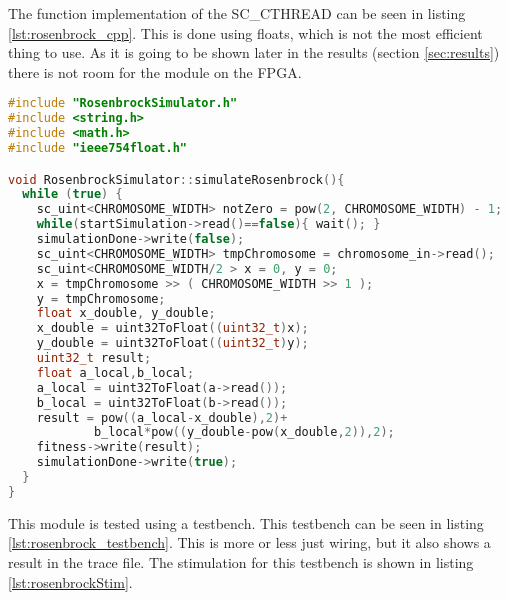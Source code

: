 The function implementation of the SC\_CTHREAD can be seen in listing \ref{lst:rosenbrock_cpp}. This is done using floats, which is not the most efficient thing to use. As it is going to be shown later in the results (section \ref{sec:results}) there is not room for the module on the FPGA. 

\begin{lstlisting}[language=C++,caption={RosenbrockSimulator.cpp},label={lst:rosenbrock_cpp}]
#include "RosenbrockSimulator.h"
#include <string.h>
#include <math.h>
#include "ieee754float.h"

void RosenbrockSimulator::simulateRosenbrock(){
  while (true) {
    sc_uint<CHROMOSOME_WIDTH> notZero = pow(2, CHROMOSOME_WIDTH) - 1;
    while(startSimulation->read()==false){ wait(); }
    simulationDone->write(false);
    sc_uint<CHROMOSOME_WIDTH> tmpChromosome = chromosome_in->read();
    sc_uint<CHROMOSOME_WIDTH/2 > x = 0, y = 0;
    x = tmpChromosome >> ( CHROMOSOME_WIDTH >> 1 );
    y = tmpChromosome;
    float x_double, y_double;
    x_double = uint32ToFloat((uint32_t)x);
    y_double = uint32ToFloat((uint32_t)y);
    uint32_t result;
    float a_local,b_local;
    a_local = uint32ToFloat(a->read());
    b_local = uint32ToFloat(b->read());
    result = pow((a_local-x_double),2)+
    		b_local*pow((y_double-pow(x_double,2)),2);
    fitness->write(result);
    simulationDone->write(true);
  }
}
\end{lstlisting}

This module is tested using a testbench. This testbench can be seen in listing \ref{lst:rosenbrock_testbench}. This is more or less just wiring, but it also shows a result in the trace file. The stimulation for this testbench is shown in listing \ref{lst:rosenbrockStim}.

